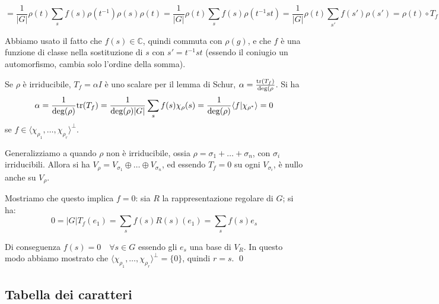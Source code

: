 \documentclass[11pt]{article}
\theoremstyle{plain}
\theoremstyle{definition}
\theoremstyle{remark}
\newcommand{\C}{\mathbb{C}}
\newcommand{\dsum}{\displaystyle\sum}
\newcommand{\ddeg}{\textnormal{deg}}
\newcommand{\ttr}{\textnormal{tr}}
\begin{document}
$$= \frac{1}{|G|}\rho(t) \dsum_s f(s) \rho(t^{-1}) \rho(s) \rho(t) = \frac{1}{|G|}\rho(t) \dsum_s f(s) \rho(t^{-1}st) = 
\frac{1}{|G|}\rho(t) \dsum_{s'} f(s') \rho(s')= \rho(t) \circ T_f$$

Abbiamo usato il fatto che $f(s)\in \C$, quindi commuta con $\rho(g)$, e che $f$ è una funzione di classe nella 
sostituzione di $s$ con $s'= t^{-1}st$ (essendo il coniugio un automorfismo, cambia solo l'ordine della somma).

Se $\rho$ è irriducibile, $T_f= \alpha I$ è uno scalare per il lemma di Schur, $\alpha= \frac{\ttr(T_f)}{\ddeg(\rho}$.
Si ha $$\alpha =\frac{1}{\ddeg(\rho)}\ttr(T_f)=\frac{1}{\ddeg(\rho)|G|}\dsum_s f(s) \chi_\rho(s)=
\frac{1}{\ddeg(\rho)} \langle f | \chi_{\rho^*} \rangle = 0$$ se $f \in \langle \chi_{\rho_1}, \ldots, \chi_{\rho_r} \rangle ^{\perp}$.

Generalizziamo a quando $\rho$ non è irriducibile, ossia $\rho = \sigma_1+ \ldots + \sigma_n$, con $\sigma_i$ irriducibili. Allora 
si ha $V_\rho = V_{\sigma_1}  \oplus \ldots \oplus V_{\sigma_n}$, ed essendo $T_f=0 $ su ogni $V_{\sigma_i}$, è nullo anche su $V_\rho$.

Mostriamo che questo implica $f=0$: sia $R$ la rappresentazione regolare di $G$; si ha:
$$ 0= |G| T_f (e_1) = \dsum_s f(s) R(s)(e_1) = \dsum_s f(s) e_s $$

Di conseguenza $f(s)=0 \quad \forall s \in G$ essendo gli $e_s$ una base di $V_R$.
In questo modo abbiamo mostrato che $\langle \chi_{\rho_1}, \ldots, \chi_{\rho_r} \rangle ^{\perp} = \{0\}$, quindi $r=s$.
\qed

















\subsection{Tabella dei caratteri}
\end{document}
